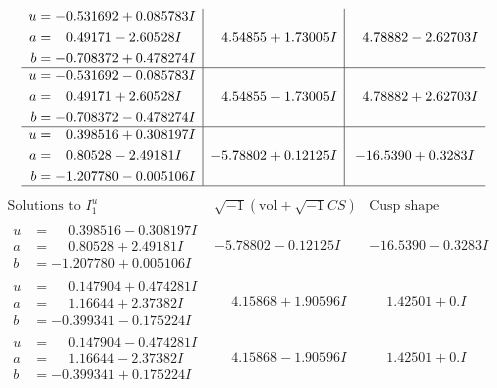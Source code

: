 \documentclass[1p]{elsarticle_modified}
\theoremstyle{definition}
\newcommand{\I}{\sqrt{-1}}
\begin{document}
$$\begin{array}{c|c|c}
\begin{aligned}
u &= -0.531692 + 0.085783 I \\
a &= \phantom{-}0.49171 - 2.60528 I \\
b &= -0.708372 + 0.478274 I\end{aligned}
 & \phantom{-}4.54855 + 1.73005 I & \phantom{-}4.78882 - 2.62703 I \\ \hline\begin{aligned}
u &= -0.531692 - 0.085783 I \\
a &= \phantom{-}0.49171 + 2.60528 I \\
b &= -0.708372 - 0.478274 I\end{aligned}
 & \phantom{-}4.54855 - 1.73005 I & \phantom{-}4.78882 + 2.62703 I \\ \hline\begin{aligned}
u &= \phantom{-}0.398516 + 0.308197 I \\
a &= \phantom{-}0.80528 - 2.49181 I \\
b &= -1.207780 - 0.005106 I\end{aligned}
 & -5.78802 + 0.12125 I & -16.5390 + 0.3283 I\\
 \hline 
 \end{array}$$\newpage$$\begin{array}{c|c|c}  
\text{Solutions to }I^u_{1}& \I (\text{vol} + \sqrt{-1}CS) & \text{Cusp shape}\\
 \hline 
\begin{aligned}
u &= \phantom{-}0.398516 - 0.308197 I \\
a &= \phantom{-}0.80528 + 2.49181 I \\
b &= -1.207780 + 0.005106 I\end{aligned}
 & -5.78802 - 0.12125 I & -16.5390 - 0.3283 I \\ \hline\begin{aligned}
u &= \phantom{-}0.147904 + 0.474281 I \\
a &= \phantom{-}1.16644 + 2.37382 I \\
b &= -0.399341 - 0.175224 I\end{aligned}
 & \phantom{-}4.15868 + 1.90596 I & \phantom{-}1.42501 + 0. I\phantom{ +0.000000I} \\ \hline\begin{aligned}
u &= \phantom{-}0.147904 - 0.474281 I \\
a &= \phantom{-}1.16644 - 2.37382 I \\
b &= -0.399341 + 0.175224 I\end{aligned}
 & \phantom{-}4.15868 - 1.90596 I & \phantom{-}1.42501 + 0. I\phantom{ +0.000000I} \\ \hline\begin{aligned}

\end{aligned}
\end{array}$$
\end{document}

